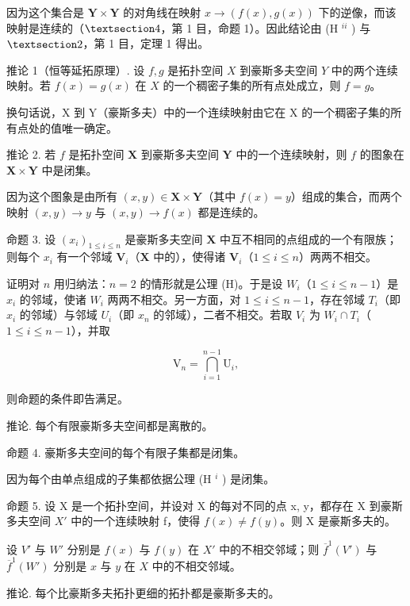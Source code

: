 因为这个集合是 \(\mathbf{Y} \times \mathbf{Y}\) 的对角线在映射 \(x \to (f(x), g(x))\) 下的逆像，而该映射是连续的（\(\S 4\)，第 1 目，命题 1）。因此结论由 (H \(^{ii}\) ) 与 \(\S 2\)，第 1 目，定理 1 得出。

推论 1（恒等延拓原理）. 设 \(f, g\) 是拓扑空间 \(X\) 到豪斯多夫空间 \(Y\) 中的两个连续映射。若 \(f(x) = g(x)\) 在 \(X\) 的一个稠密子集的所有点处成立，则 \(f = g\)。

换句话说，X 到 Y（豪斯多夫）中的一个连续映射由它在 X 的一个稠密子集的所有点处的值唯一确定。

推论 2. 若 \(f\) 是拓扑空间 \(\mathbf{X}\) 到豪斯多夫空间 \(\mathbf{Y}\) 中的一个连续映射，则 \(f\) 的图象在 \(\mathbf{X} \times \mathbf{Y}\) 中是闭集。

因为这个图象是由所有 \((x, y) \in \mathbf{X} \times \mathbf{Y}\)（其中 \(f(x) = y\)）组成的集合，而两个映射 \((x, y) \to y\) 与 \((x, y) \to f(x)\) 都是连续的。

命题 3. 设 \((x_{i})_{1\leqslant i\leqslant n}\) 是豪斯多夫空间 \(\mathbf{X}\) 中互不相同的点组成的一个有限族；则每个 \(x_{i}\) 有一个邻域 \(\mathbf{V}_{i}\)（\(\mathbf{X}\) 中的），使得诸 \(\mathbf{V}_{i}\)（\(1\leqslant i\leqslant n\)）两两不相交。

证明对 \(n\) 用归纳法：\(n = 2\) 的情形就是公理 (H)。于是设 \(W_i\)（\(1 \leqslant i \leqslant n - 1\)）是 \(x_i\) 的邻域，使诸 \(W_i\) 两两不相交。另一方面，对 \(1 \leqslant i \leqslant n - 1\)，存在邻域 \(T_i\)（即 \(x_i\) 的邻域）与邻域 \(U_i\)（即 \(x_n\) 的邻域），二者不相交。若取 \(V_i\) 为 \(W_i \cap T_i\)（\(1 \leqslant i \leqslant n - 1\)），并取

\[
\mathrm{V} _ {n} = \bigcap_ {i = 1} ^ {n - 1} \mathrm{U} _ {i},
\]

则命题的条件即告满足。

推论. 每个有限豪斯多夫空间都是离散的。

命题 4. 豪斯多夫空间的每个有限子集都是闭集。

因为每个由单点组成的子集都依据公理 (H \(^{i}\) ) 是闭集。

命题 5. 设 X 是一个拓扑空间，并设对 X 的每对不同的点 x, y，都存在 X 到豪斯多夫空间 \(X'\) 中的一个连续映射 f，使得 \(f(x) \neq f(y)\)。则 X 是豪斯多夫的。

设 \(V'\) 与 \(W'\) 分别是 \(f(x)\) 与 \(f(y)\) 在 \(X'\) 中的不相交邻域；则 \(\overline{f}^1(V')\) 与 \(\overline{f}^1(W')\) 分别是 \(x\) 与 \(y\) 在 \(X\) 中的不相交邻域。

推论. 每个比豪斯多夫拓扑更细的拓扑都是豪斯多夫的。

